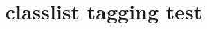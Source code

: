 \documentclass[12pt,a4paper]{exam}
\title{classlist tagging test}
\begin{document}
\MainClassName

\PrintClassList
\end{document}
